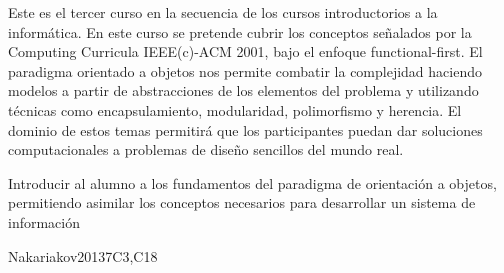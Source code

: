 \begin{syllabus}


\begin{justification}
Este es el tercer curso en la secuencia de los cursos introductorios a la informática. En este curso se pretende cubrir los
conceptos señalados por la Computing Curricula IEEE(c)-ACM 2001, bajo el enfoque functional-first.
El paradigma orientado a objetos nos permite combatir la complejidad haciendo modelos a partir de abstracciones
de los elementos del problema y utilizando técnicas como encapsulamiento, modularidad, polimorfismo y herencia. El
dominio de estos temas permitirá que los participantes puedan dar soluciones computacionales a problemas de diseño
sencillos del mundo real.
\end{justification}

\begin{goals}
\item Introducir al alumno a los fundamentos del paradigma de orientación a objetos, permitiendo asimilar los conceptos
necesarios para desarrollar un sistema de información
\end{goals}

\begin{outcomes}
    \item {}
    \item {}
    \item {}
\end{outcomes}

\begin{competences}
    \item {} 
    \item {} 
    \item {}
    \item {} 
    \item {}
\end{competences}

\begin{unit}{\DSGraphsandTrees}{}{Nakariakov2013}{7}{C3,C18}
\begin{topics}
	\item \DSGraphsandTreesTopicTrees 
	\item \DSGraphsandTreesTopicUndirected
	\item \DSGraphsandTreesTopicDirected
	\item \DSGraphsandTreesTopicWeighted
	\item \DSGraphsandTreesTopicSpanning
	\item \DSGraphsandTreesTopicGraph
\end{topics}


\end{unit}
\end{syllabus}
